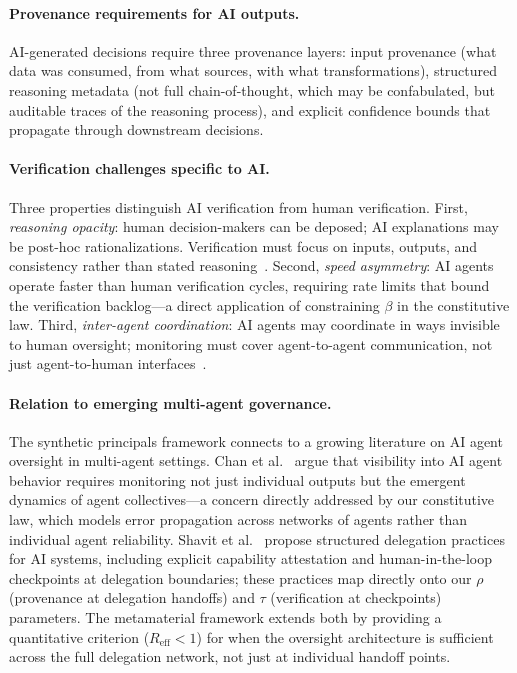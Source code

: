 \documentclass[runningheads]{llncs}
\begin{document}
\paragraph{Provenance requirements for AI outputs.}
AI-generated decisions require three provenance layers: input provenance (what data was consumed, from what sources, with what transformations), structured reasoning metadata (not full chain-of-thought, which may be confabulated, but auditable traces of the reasoning process), and explicit confidence bounds that propagate through downstream decisions.

\paragraph{Verification challenges specific to AI.}
Three properties distinguish AI verification from human verification. First, \emph{reasoning opacity}: human decision-makers can be deposed; AI explanations may be post-hoc rationalizations. Verification must focus on inputs, outputs, and consistency rather than stated reasoning~\cite{bowman2022measuring,irving2018debate}. Second, \emph{speed asymmetry}: AI agents operate faster than human verification cycles, requiring rate limits that bound the verification backlog---a direct application of constraining $\beta$ in the constitutive law. Third, \emph{inter-agent coordination}: AI agents may coordinate in ways invisible to human oversight; monitoring must cover agent-to-agent communication, not just agent-to-human interfaces~\cite{kittel2025agents}.

\paragraph{Relation to emerging multi-agent governance.}
The synthetic principals framework connects to a growing literature on AI agent oversight in multi-agent settings. Chan et al.~\cite{chan2024visibility} argue that visibility into AI agent behavior requires monitoring not just individual outputs but the emergent dynamics of agent collectives---a concern directly addressed by our constitutive law, which models error propagation across networks of agents rather than individual agent reliability. Shavit et al.~\cite{shavit2023practices} propose structured delegation practices for AI systems, including explicit capability attestation and human-in-the-loop checkpoints at delegation boundaries; these practices map directly onto our $\rho$ (provenance at delegation handoffs) and $\tau$ (verification at checkpoints) parameters. The metamaterial framework extends both by providing a quantitative criterion ($R_{\mathrm{eff}} < 1$) for when the oversight architecture is sufficient across the full delegation network, not just at individual handoff points.
\end{document}

